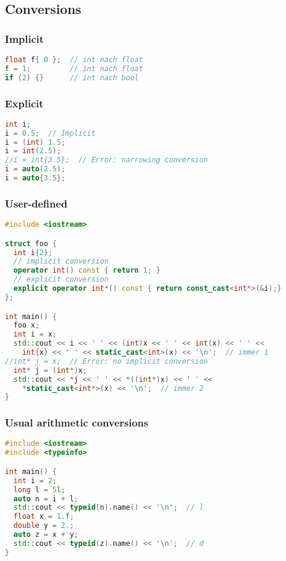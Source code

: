 \documentclass[10pt,twocolumn]{scrartcl}
\begin{document}
\subsection{Conversions}

\subsubsection{Implicit}

\begin{lstlisting}[language=C++]
float f{ 0 };  // int nach float
f = 1;         // int nach float
if (2) {}      // int nach bool
\end{lstlisting}

\subsubsection{Explicit}

\begin{lstlisting}[language=C++]
int i;
i = 0.5;  // Implicit
i = (int) 1.5;
i = int(2.5);
//i = int{3.5};  // Error: narrowing conversion
i = auto(2.5);
i = auto{3.5};
\end{lstlisting}

\subsubsection{User-defined}

\begin{lstlisting}[language=C++]
#include <iostream>

struct foo {
  int i{2};
  // implicit conversion
  operator int() const { return 1; }
  // explicit conversion
  explicit operator int*() const { return const_cast<int*>(&i);}
};

int main() {
  foo x;
  int i = x;
  std::cout << i << ' ' << (int)x << ' ' << int(x) << ' ' <<
    int{x} << ' ' << static_cast<int>(x) << '\n';  // immer 1
//int* j = x;  // Error: no implicit conversion
  int* j = (int*)x;
  std::cout << *j << ' ' << *((int*)x) << ' ' <<
    *static_cast<int*>(x) << '\n';  // immer 2
}
\end{lstlisting}

\subsubsection{Usual arithmetic conversions}

\begin{lstlisting}[language=C++]
#include <iostream>
#include <typeinfo>

int main() {
  int i = 2;
  long l = 5l;
  auto n = i + l;
  std::cout << typeid(n).name() << '\n';  // l
  float x = 1.f;
  double y = 2.;
  auto z = x + y;
  std::cout << typeid(z).name() << '\n';  // d
}
\end{lstlisting}
\end{document}
